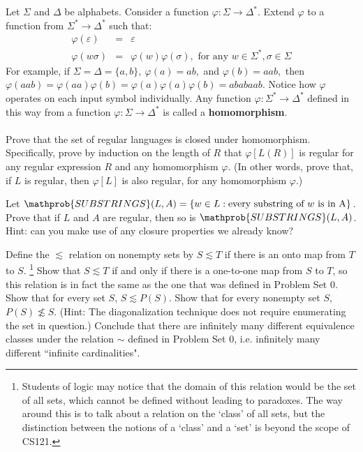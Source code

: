 \documentclass[letterpaper, ps]{cs121}
\begin{document}
 Let $\Sigma$ and $\Delta$ be alphabets. Consider a
function $\varphi: \Sigma \rightarrow \Delta^*$. Extend $\varphi$ to
a function from $\Sigma^* \rightarrow \Delta^*$ such that:
\begin{eqnarray*}
\varphi(\varepsilon) & = & \varepsilon \\
\varphi(w\sigma ) & = & \varphi(w)\varphi(\sigma ), \textrm{ for any }
w \in  \Sigma ^*, \sigma  \in  \Sigma
\end{eqnarray*}
For example, if $\Sigma = \Delta = \{a,b\},~\varphi(a) = ab,$ and
$\varphi(b) = aab,$ then
$\varphi(aab)=\varphi(aa)\varphi(b)=\varphi(a)\varphi(a)\varphi(b)=ababaab$.
 Notice how $\varphi$ operates on each input symbol individually. Any
function $\varphi:\Sigma^* \rightarrow \Delta^*$ defined in this way
from a function $\varphi: \Sigma \rightarrow \Delta^*$ is called a
{\bf
homomorphism}.\\\\
Prove that the set of regular languages is closed under
homomorphism.  Specifically, prove by induction on the length of $R$
that $\varphi[L(R)]$ is regular for any regular expression $R$ and
any homomorphism $\varphi$.  (In other words, prove that, if $L$ is
regular, then $\varphi[L]$ is also regular, for any homomorphism
$\varphi$.)


Let $\mathprob{SUBSTRINGS}(L,A) = \{w \in L : \text{every substring of } w \text{ is in A}\}$. Prove that if $L$ and $A$ are regular, then so is $\mathprob{SUBSTRINGS}(L,A)$. Hint: can you make use of any closure properties we already know?


\subproblem    Define the $\lesssim$ relation on nonempty sets by $S\lesssim T$ if 
there is an onto map from $T$ to $S$. \footnote{Students of logic may notice that the domain of this 
relation would be the set of all sets, which cannot be defined without 
leading to paradoxes.  The way around this is to talk about a relation on 
the `class' of all sets, but the distinction between the notions of a 
`class' and a `set' is beyond the scope of CS121.} Show that $S\lesssim T$ if and only if 
there is a one-to-one map from $S$ to $T$, so this relation is in fact the same as the one
that was defined in Problem Set 0.
\subproblem Show that for every set $S$, $S \lesssim P(S)$.
\subproblem   Show that for every nonempty set $S$, $P(S) \not\lesssim S$.
(Hint: The diagonalization technique does not require enumerating the set in question.) 
\subproblem Conclude that there are infinitely many different equivalence classes
under the relation $\sim$ defined in Problem Set 0, i.e. infinitely many different ``infinite cardinalities".
\end{document}
